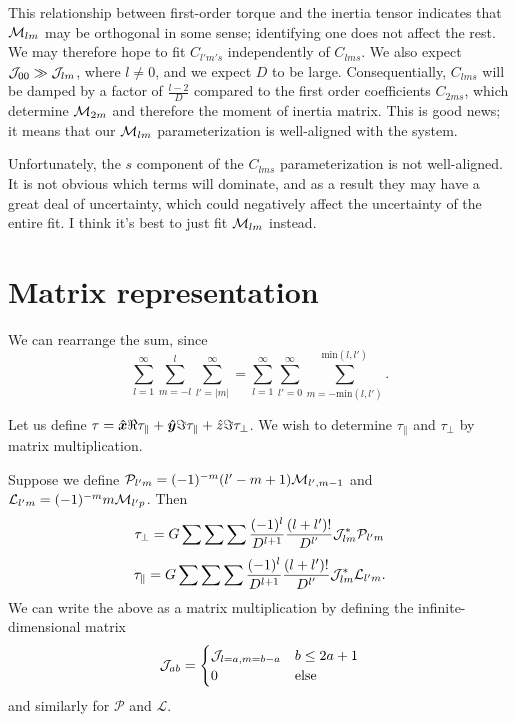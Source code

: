 \documentclass[aps,twocolumn,secnumarabic,balancelastpage,amsmath,amssymb,nofootinbib,floatfix]{revtex4-1}
\begin{document}
This relationship between first-order torque and the inertia tensor indicates that $\mathcal{M}_{lm}$ may be orthogonal in some sense; identifying one does not affect the rest. We may therefore hope to fit $C_{l'm's}$ independently of $C_{lms}$. We also expect $\mathcal{J}_{00}\gg \mathcal{J}_{lm}$, where $l\neq 0$, and we expect $D$ to be large. Consequentially, $C_{lms}$ will be damped by a factor of $\frac{l-2}{D}$ compared to the first order coefficients $C_{2ms}$, which determine $\mathcal{M}_{2m}$ and therefore the moment of inertia matrix. This is good news; it means that our $\mathcal{M}_{lm}$ parameterization is well-aligned with the system.

Unfortunately, the $s$ component of the $C_{lms}$ parameterization is not well-aligned. It is not obvious which terms will dominate, and as a result they may have a great deal of uncertainty, which could negatively affect the uncertainty of the entire fit. I think it's best to just fit $\mathcal{M}_{lm}$ instead.


\clearpage


\section{Matrix representation}
We can rearrange the sum, since
$$\sum_{l=1}^\infty \sum_{m=-l}^l\sum_{l'=|m|}^\infty = \sum_{l=1}^\infty \sum_{l'=0}^\infty \sum_{m=-\text{min}(l,l')}^{\text{min}(l,l')}.$$

Let us define $\tau = \bm{\hat x} \Re\tau_{\parallel} + \bm{\hat y} \Im \tau_{\parallel} + \hat z \Im\tau_\perp$. We wish to determine $\tau_\parallel$ and $\tau_\perp$ by matrix multiplication.

Suppose we define $\mathcal{P}_{l'm} = (-1)^{-m}(l' - m + 1) \mathcal{M}_{l',m-1}$ and
$\mathcal{L}_{l'm}=(-1)^{-m}m\mathcal{M}_{l'p}$. Then
$$\tau_\perp =G\sum \sum \sum \frac{(-1)^l}{D^{l+1}} \frac{(l+l')!}{D^{l'}}\mathcal{J}_{lm}^*\mathcal{P}_{l'm}$$
$$\tau_\parallel =G\sum \sum \sum \frac{(-1)^l}{D^{l+1}} \frac{(l+l')!}{D^{l'}}\mathcal{J}_{lm}^*\mathcal{L}_{l'm}.$$
We can write the above as a matrix multiplication by defining the infinite-dimensional matrix
$$\mathcal{J}_{ab} = \begin{cases}
    \mathcal{J}_{l=a,m=b-a} & b \leq 2a+1 \\
    0 & \text{else}
\end{cases}$$
and similarly for $\mathcal{P}$ and $\mathcal{L}$.



\end{document}
